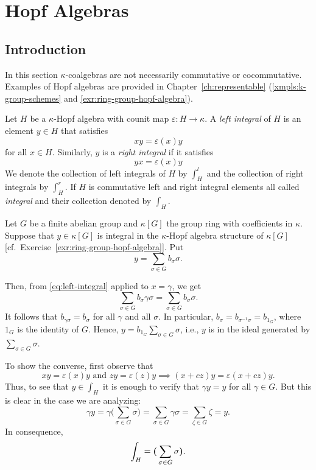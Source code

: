 \chapter{Hopf Algebras}

\section{Introduction}

In this section $\kappa$-coalgebras are not necessarily commutative or cocommutative. Examples of Hopf algebras are provided in Chapter~\ref{ch:representable} (\ref{xmpls:k-group-schemes} and \ref{exr:ring-group-hopf-algebra}).

\begin{defn}
    Let $H$ be a $\kappa$-Hopf algebra with counit map $\varepsilon: H \to\kappa$. A \textsl{left integral} of $H$ is an element $y\in H$ that satisfies
    \begin{equation}\label{eq:left-integral}
        xy=\varepsilon(x)y
    \end{equation}
    for all $x\in H$. Similarly, $y$ is a \textsl{right integral} if it satisfies
    \begin{equation}\label{eq:right-integral}
        yx = \varepsilon(x)y
    \end{equation}
    We denote the collection of left integrals of $H$ by $\int_H^l$ and the collection of right integrals by $\int_H^r$. If $H$ is commutative left and right integral elements all called \textsl{integral} and their collection denoted by $\int_H$.
\end{defn}

\begin{xmpl}
    Let $G$ be a finite abelian group and $\kappa[G]$ the group ring with coefficients in $\kappa$. Suppose that $y\in\kappa[G]$ is integral in the $\kappa$-Hopf algebra structure of $\kappa[G]$ [cf.~Exercise~\ref{exr:ring-group-hopf-algebra}]. Put
    $$
        y = \sum_{\sigma\in G}b_\sigma\sigma.
    $$
    
    Then, from \eqref{eq:left-integral} applied to $x=\gamma$, we get
    $$
        \sum_{\sigma\in G}b_\sigma\gamma\sigma
            = \sum_{\sigma\in G}b_\sigma\sigma.
    $$
    It follows that $b_{\gamma\sigma}=b_\sigma$ for all $\gamma$ and all $\sigma$. In particular, $b_\sigma=b_{\sigma^{-1}\sigma}=b_{1_G}$, where $1_G$ is the identity of $G$. Hence, $y=b_{1_G}\sum_{\sigma\in G}\sigma$, i.e., $y$ is in the ideal generated by $\sum_{\sigma\in G}\sigma$.
    
    To show the converse, first observe that
    $$
        xy=\varepsilon(x)y\text{ and }zy=\varepsilon(z)y
            \implies(x+cz)y = \varepsilon(x+cz)y.
    $$
    Thus, to see that $y\in\int_H$ it is enough to verify that $\gamma y=y$ for all $\gamma\in G$. But this is clear in the case we are analyzing:
    $$
        \gamma y = \gamma\Big(\sum_{\sigma\in G}\sigma\Big)
            = \sum_{\sigma\in G}\gamma\sigma = \sum_{\zeta\in G}\zeta = y.
    $$
    In consequence,
    $$
        \int_H = \textrm{\boldmath$($}\sum_{\sigma\in G}\sigma\textrm{\boldmath$)$}.
    $$
\end{xmpl}


